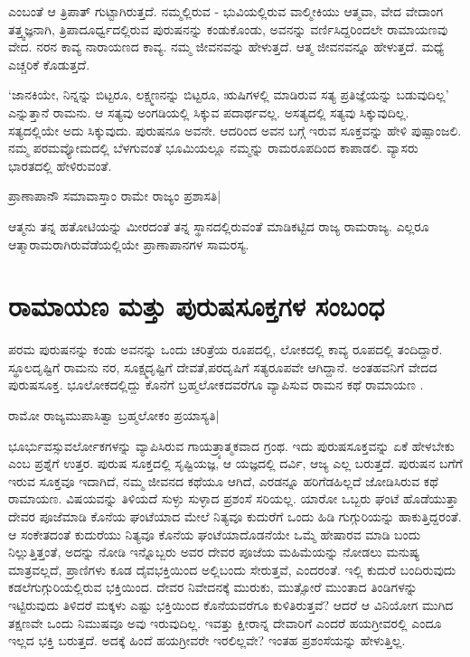 ಎಂಬಂತೆ ಆ ತ್ರಿಪಾತ್ ಗುಟ್ಟಾಗಿರುತ್ತದೆ. ನಮ್ಮಲ್ಲಿರುವ - ಭುವಿಯಲ್ಲಿರುವ ವಾಲ್ಮೀಕಿಯು ಆತ್ಮವಾ, ವೇದ ವೇದಾಂಗ ತತ್ತ್ವಜ್ಞನಾಗಿ, ತ್ರಿಪಾದೂರ್ಧ್ವದಲ್ಲಿರುವ ಪುರುಷನನ್ನು ಕಂಡುಕೊಂಡು, ಅವನನ್ನು ವರ್ಣಿಸಿದ್ದರಿಂದಲೇ ರಾಮಾಯಣವು ವೇದ. ನರನ ಕಾವ್ಯ ನಾರಾಯಣದ ಕಾವ್ಯ. ನಮ್ಮ ಜೀವನವನ್ನು ಹೇಳುತ್ತದೆ. ಆತ್ಮ ಜೀವನವನ್ನೂ ಹೇಳುತ್ತದೆ. ಮಧ್ಯೆ ಎಚ್ಚರಿಕೆ ಕೊಡುತ್ತದೆ. 

`ಜಾನಕಿಯೇ, ನಿನ್ನನ್ನು ಬಿಟ್ಟರೂ, ಲಕ್ಷ್ಮಣನನ್ನು ಬಿಟ್ಟರೂ, ಋಷಿಗಳಲ್ಲಿ ಮಾಡಿರುವ ಸತ್ಯ ಪ್ರತಿಜ್ಞೆಯನ್ನು  ಬಡುವುದಿಲ್ಲ' ಎನ್ನುತ್ತಾನೆ ರಾಮನು. ಆ ಸತ್ಯವು ಅಂಗಡಿಯಲ್ಲಿ ಸಿಕ್ಕುವ ಪದಾರ್ಥವಲ್ಲ. ಅಸತ್ಯದಲ್ಲಿ ಸತ್ಯವು ಸಿಕ್ಕುವುದಿಲ್ಲ. ಸತ್ಯದಲ್ಲಿಯೇ ಅದು ಸಿಕ್ಕುವುದು. ಪುರುಷನೂ ಅವನೇ. ಆದರಿಂದ ಅವನ ಬಗ್ಗೆ ಇರುವ ಸೂಕ್ತವನ್ನು ಹೇಳಿ ಪುಷ್ಪಾಂಜಲಿ. ನಮ್ಮ ಪರಮವ್ಯೋಮದಲ್ಲಿ ಬೆಳಗುವಂತೆ ಭೂಮಿಯಲ್ಲೂ ನಮ್ಮನ್ನು ರಾಮರೂಪದಿಂದ ಕಾಪಾಡಲಿ. ವ್ಯಾಸರು ಭಾರತದಲ್ಲಿ ಹೇಳಿರುವಂತೆ.

\begin{shloka}
ಪ್ರಾಣಾಪಾನೌ ಸಮಾವಾಸ್ತಾಂ ರಾಮೇ ರಾಜ್ಯಂ ಪ್ರಶಾಸತಿ|
\end{shloka}

ಆತ್ಮನು ತನ್ನ ಹತೋಟಿಯನ್ನು ಮೀರದಂತೆ ತನ್ನ ಸ್ಥಾನದಲ್ಲಿರುವಂತೆ ಮಾಡಿಕಟ್ಟಿದ ರಾಜ್ಯ ರಾಮರಾಜ್ಯ. ಎಲ್ಲರೂ ಆತ್ಮಾರಾಮರಾಗಿರುವೆಡೆಯಲ್ಲಿಯೇ ಪ್ರಾಣಾಪಾನಗಳ ಸಾಮರಸ್ಯ. 

\section*{ರಾಮಾಯಣ ಮತ್ತು ಪುರುಷಸೂಕ್ತಗಳ ಸಂಬಂಧ}

ಪರಮ ಪುರುಷನನ್ನು ಕಂಡು ಅವನನ್ನು ಒಂದು ಚರಿತ್ರೆಯ ರೂಪದಲ್ಲಿ, ಲೋಕದಲ್ಲಿ ಕಾವ್ಯ ರೂಪದಲ್ಲಿ ತಂದಿದ್ದಾರೆ. ಸ್ಥೂಲದೃಷ್ಟಿಗೆ ರಾಮನು ನರ, ಸೂಕ್ಷ್ಮದೃಷ್ಟಿಗೆ ದೇವತೆ,ಪರದೃಷಿಗೆ ಸತ್ಯರೂಪವೇ ಆಗಿದ್ದಾನೆ. ಅಂತಹವನಿಗೆ ವೇದದ ಪುರುಷಸೂಕ್ತ. ಭೂಲೋಕದಲ್ಲಿದ್ದು ಕೊನೆಗೆ ಬ್ರಹ್ಮಲೋಕದವರೆಗೂ ವ್ಯಾಪಿಸುವ ರಾಮನ ಕಥೆ ರಾಮಾಯಣ . 

\begin{shloka}
ರಾಮೋ ರಾಜ್ಯಮುಪಾಸಿತ್ವಾ ಬ್ರಹ್ಮಲೋಕಂ ಪ್ರಯಾಸ್ಯತಿ|
\end{shloka}

ಭೂರ್ಭುವಸ್ಸುವರ್ಲೋಕಗಳನ್ನು ವ್ಯಾಪಿಸಿರುವ ಗಾಯತ್ರ್ಯಾತ್ಮಕವಾದ ಗ್ರಂಥ. ಇದು ಪುರುಷಸೂಕ್ತವನ್ನು ಏಕೆ ಹೇಳಬೇಕು ಎಂಬ ಪ್ರಶ್ನೆಗೆ ಉತ್ತರ. ಪುರುಷ ಸೂಕ್ತದಲ್ಲಿ ಸೃಷ್ಟಿಯಜ್ಞ, ಆ ಯಜ್ಞದಲ್ಲಿ ದರ್ವಿ, ಆಜ್ಯ ಎಲ್ಲ ಬರುತ್ತದೆ. ಪುರುಷನ ಬಗೆಗೆ ಇರುವ ಸೂಕ್ತವೂ ಇದಾಗಿದೆ, ನಮ್ಮ ಜೀವನದ ಕಥೆಯೂ ಆಗಿದೆ, ಎರಡನ್ನೂ ಹರಿಗೆಡಹಿಲ್ಲದೆ ಜೋಡಿಸಿರುವ ಕಥೆ ರಾಮಾಯಣ. ವಿಷಯವನ್ನು ತಿಳಿಯದೆ ಸುಳ್ಳು ಸುಳ್ಳಾದ ಪ್ರಶಂಸೆ ಸರಿಯಲ್ಲ. ಯಾರೋ ಒಬ್ಬರು ಘಂಟೆ ಹೊಡೆಯುತ್ತಾ ದೇವರ ಪೂಜೆಮಾಡಿ ಕೊನೆಯ ಘಂಟೆಯಾದ ಮೇಲೆ ನಿತ್ಯವೂ ಕುದುರೆಗೆ ಒಂದು ಹಿಡಿ ಗುಗ್ಗುರಿಯನ್ನು ಹಾಕುತ್ತಿದ್ದರಂತೆ. ಆ ಸಂಕೇತದಂತೆ ಕುದುರೆಯು ನಿತ್ಯವೂ ಕೊನೆಯ ಘಂಟೆಯಾದೊಡನೆಯೇ ಒಮ್ಮೆ ಹೇಷಾರವ ಮಾಡಿ ಬಂದು ನಿಲ್ಲುತ್ತಿತ್ತಂತೆ, ಅದನ್ನು ನೋಡಿ ಇನ್ನೊಬ್ಬರು ಅವರ ದೇವರ ಪೂಜೆಯ ಮಹಿಮೆಯನ್ನು ನೋಡಲು ಮನುಷ್ಯ ಮಾತ್ರವಲ್ಲದೆ, ಪ್ರಾಣಿಗಳು ಕೂಡ ದೈವಭಕ್ತಿಯಿಂದ ಅಲ್ಲಿಬಂದು ಸೇರುತ್ತವೆ, ಎಂದರಂತೆ. ಇಲ್ಲಿ ಕುದುರೆ ಬಂದಿರುವುದು ಕಡಲೆಗುಗ್ಗುರಿಯಲ್ಲಿರುವ ಭಕ್ತಿಯಿಂದ. ದೇವರ ನಿವೇದನಕ್ಕೆ ಮುರುಕು, ಮುತ್ಸೋರೆ ಮುಂತಾದ ತಿಂಡಿಗಳನ್ನು ಇಟ್ಟಿರುವುದು ತಿಳಿದರೆ ಮಕ್ಕಳು ಎಷ್ಟು ಭಕ್ತಿಯಿಂದ ಕೊನೆಯವರೆಗೂ ಕುಳಿತಿರುತ್ತವೆ? ಆದರೆ ಆ ವಿನಿಯೋಗ ಮುಗಿದ ತಕ್ಷಣವೇ ಒಂದು ನಿಮುಷವೂ ಅವು ಇರುವುದಿಲ್ಲ. ಇವತ್ತು ಕ್ಷೀರಾನ್ನ ದೇವಾರಿಗೆ ಎಂದರೆ ಹಯಗ್ರೀವರಲ್ಲಿ ಎಂದೂ ಇಲ್ಲದ ಭಕ್ತಿ ಬರುತ್ತದೆ. ಅದಕ್ಕೆ ಹಿಂದೆ ಹಯಗ್ರೀವರೇ ಇರಲಿಲ್ಲವೇ? ಇಂತಹ ಪ್ರಶಂಸೆಯನ್ನು ಹೇಳುತ್ತಿಲ್ಲ. 

